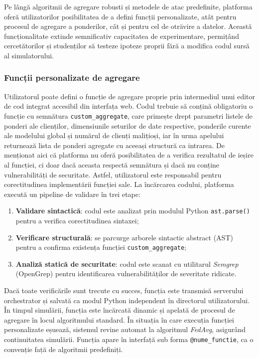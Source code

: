 \documentclass[../../main.tex]{subfiles}
\begin{document}
    Pe lângă algoritmii de agregare robusti și metodele de atac predefinite, platforma oferă utilizatorilor posibilitatea de a defini funcții personalizate, atât pentru procesul de agregare a ponderilor, cât și pentru cel de otrăvire a datelor. Această funcționalitate extinde semnificativ capacitatea de experimentare, permi\-țând cercetătorilor și studenților să testeze ipoteze proprii fără a modifica codul sursă al simulatorului.

    \subsubsection{Funcții personalizate de agregare}

    Utilizatorul poate defini o funcție de agregare proprie prin intermediul unui editor de cod integrat accesibil din interfața web. Codul trebuie să conțină obligatoriu o funcție cu semnătura \texttt{custom\_aggregate}, care primește drept parametri listele de ponderi ale clienților, dimensiunile seturilor de date respective, ponderile curente ale modelului global și numărul de clienți malițioși, iar în urma apelului returnează lista de ponderi agregate cu aceeași structură ca intrarea.
    De menționat aici că platforma nu oferă posibilitatea de a verifica rezultatul de ieșire al funcției, ci doar dacă aceasta respectă semnătura și dacă nu conține vulnerabilități de securitate. Astfel, utilizatorul este responsabil pentru corectitudinea implementării funcției sale.
    La încărcarea codului, platforma execută un pipeline de validare în trei etape:

    \begin{enumerate}
        \item \textbf{Validare sintactică}: codul este analizat prin modulul Python \texttt{ast.parse()} pentru a verifica corectitudinea sintaxei;
        \item \textbf{Verificare structurală}: se parcurge arborele sintactic abstract (AST) pentru a confirma existența funcției \texttt{custom\_aggregate};
        \item \textbf{Analiză statică de securitate}: codul este scanat cu utilitarul \textit{Semgrep} (OpenGrep) pentru identificarea vulnerabilităților de severitate ridicate.
    \end{enumerate}

    Dacă toate verificările sunt trecute cu succes, funcția este transmisă serverului orchestrator și salvată ca modul Python independent în directorul utilizatorului. În timpul simulării, funcția este încărcată dinamic și apelată de procesul de agregare în locul algoritmului standard. În situația în care execuția funcției personalizate eșuează, sistemul revine automat la algoritmul \textit{FedAvg}, asigurând continuitatea simulării. Funcția apare în interfață sub forma \texttt{@nume\_functie}, ca o convenție față de algoritmii predefiniți.
\end{document}
